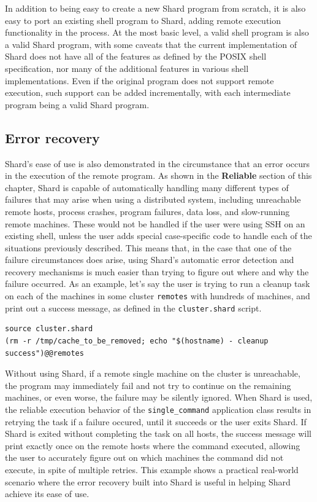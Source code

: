 \documentclass[twoside]{report}
\newcommand{\todoi}[1]{\todo[inline, color=blue!20]{TODO: {#1}}}
\begin{document}
In addition to being easy to create a new Shard program from scratch, it is also easy to port an existing shell program to Shard, adding remote execution functionality in the process.
At the most basic level, a valid shell program is also a valid Shard program, with some caveats that the current implementation of Shard does not have all of the features as defined by the POSIX shell specification, nor many of the additional features in various shell implementations.
Even if the original program does not support remote execution, such support can be added incrementally, with each intermediate program being a valid Shard program.

\subsection{Error recovery}

Shard's ease of use is also demonstrated in the circumstance that an error occurs in the execution of the remote program.
As shown in the \textbf{Reliable} section of this chapter, Shard is capable of automatically handling many different types of failures that may arise when using a distributed system, including unreachable remote hosts, process crashes, program failures, data loss, and slow-running remote machines.
These would not be handled if the user were using SSH on an existing shell, unless the user adds special case-specific code to handle each of the situations previously described.
This means that, in the case that one of the failure circumstances does arise, using Shard's automatic error detection and recovery mechanisms is much easier than trying to figure out where and why the failure occurred.
As an example, let's say the user is trying to run a cleanup task on each of the machines in some cluster \texttt{remotes} with hundreds of machines, and print out a success message, as defined in the \texttt{cluster.shard} script.

\begin{minipage}[c]{\textwidth-15pt}
  \begin{lstlisting}[language=Shard]
source cluster.shard
(rm -r /tmp/cache_to_be_removed; echo "$(hostname) - cleanup success")@@remotes
\end{lstlisting}
  \smallskip
\end{minipage}

Without using Shard, if a remote single machine on the cluster is unreachable, the program may immediately fail and not try to continue on the remaining machines, or even worse, the failure may be silently ignored.
When Shard is used, the reliable execution behavior of the \texttt{single\_command} application class results in retrying the task if a failure occured, until it succeeds or the user exits Shard.
If Shard is exited without completing the task on all hosts, the success message will print exactly once on the remote hosts where the command executed, allowing the user to accurately figure out on which machines the command did not execute, in spite of multiple retries.
This example shows a practical real-world scenario where the error recovery built into Shard is useful in helping Shard achieve its ease of use.
\end{document}
